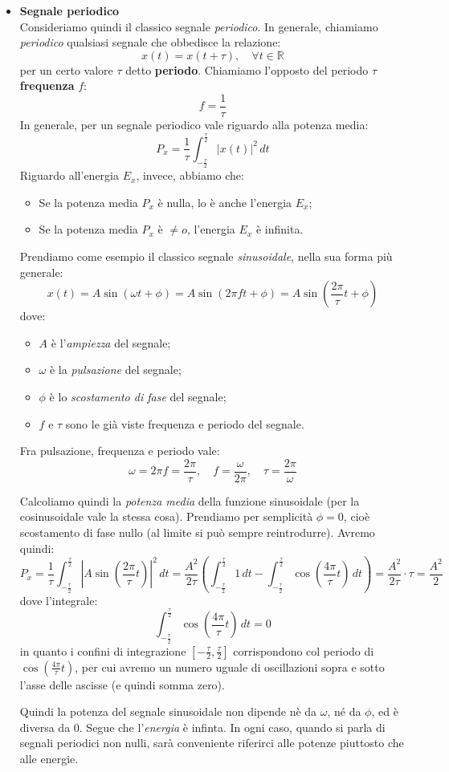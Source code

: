 \documentclass[a4paper,11pt]{article}
\begin{document}
\begin{itemize}
\item \textbf{\textsf{Segnale periodico}} \\
Consideriamo quindi il classico segnale \textit{periodico}. In generale, chiamiamo \textit{periodico} qualsiasi segnale che obbedisce la relazione:
$$
x(t) = x(t + \tau), \quad \forall t \in \mathbb{R}
$$
per un certo valore $\tau$ detto \textbf{periodo}. Chiamiamo l'opposto del periodo $\tau$ \textbf{frequenza} $f$:
$$
f = \frac{1}{\tau}
$$
In generale, per un segnale periodico vale riguardo alla potenza media:
$$
P_x = \frac{1}{\tau} \int_{-\frac{\tau}{2}}^{\frac{\tau}{2}} | x(t) |^2 \, dt
$$
Riguardo all'energia $E_x$, invece, abbiamo che:
\begin{itemize}
	\item Se la potenza media $P_x$ è nulla, lo è anche l'energia $E_x$;
	\item Se la potenza media $P_x$ è $\neq o$, l'energia $E_x$ è infinita.
\end{itemize}

Prendiamo come esempio il classico segnale \textit{sinusoidale}, nella sua forma più generale:
$$
x(t) = A \sin(\omega t + \phi) = A \sin(2 \pi f t + \phi) = A \sin\left( \frac{2 \pi}{\tau} t + \phi \right)
$$
dove:
\begin{itemize}
	\item $A$ è l'\textit{ampiezza} del segnale;
	\item $\omega$ è la \textit{pulsazione} del segnale;
	\item $\phi$ è lo \textit{scostamento di fase} del segnale;
	\item $f$ e $\tau$ sono le già viste frequenza e periodo del segnale.
\end{itemize}
Fra pulsazione, frequenza e periodo vale:
$$
\omega = 2 \pi f = \frac{2 \pi}{\tau}, \quad f = \frac{\omega}{2\pi}, \quad \tau = \frac{2\pi}{\omega}
$$

Calcoliamo quindi la \textit{potenza media} della funzione sinusoidale (per la cosinusoidale vale la stessa cosa). Prendiamo per semplicità $\phi = 0$, cioè scostamento di fase nullo (al limite si può sempre reintrodurre). Avremo quindi:
$$
P_x = \frac{1}{\tau} \int_{-\frac{\tau}{2}}^{\frac{\tau}{2}} \left| A \sin \left( \frac{2 \pi}{\tau} t \right) \right|^2 \, dt = \frac{A^2}{2 \tau} \left( \int_{-\frac{\tau}{2}}^{\frac{\tau}{2}} 1 \, dt - \int_{-\frac{\tau}{2}}^{\frac{\tau}{2}} \cos\left( \frac{4\pi}{\tau} t \right)  \, dt \right) = \frac{A^2}{2\tau} \cdot \tau = \frac{A^2}{2}
$$
dove l'integrale:
$$
\int_{-\frac{\tau}{2}}^{\frac{\tau}{2}} \cos \left( \frac{4 \pi}{\tau} t \right) \, dt = 0
$$
in quanto i confini di integrazione $[-\frac{\tau}{2}, \frac{\tau}{2}]$ corrispondono col periodo di $\cos \left( \frac{4 \pi}{\tau} t \right)$, per cui avremo un numero uguale di oscillazioni sopra e sotto l'asse delle ascisse (e quindi somma zero).

Quindi la potenza del segnale sinusoidale non dipende nè da $\omega$, né da $\phi$, ed è diversa da 0. Segue che l'\textit{energia} è infinta. In ogni caso, quando si parla di segnali periodici non nulli, sarà conveniente riferirci alle potenze piuttosto che alle energie.
\end{itemize}
\end{document}
